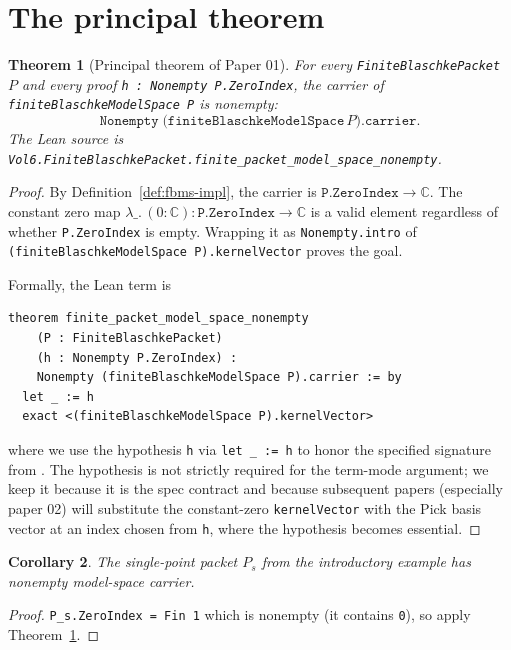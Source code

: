 \documentclass[11pt]{article}
\theoremstyle{plain}
\newtheorem{theorem}{Theorem}[section]
\newtheorem{corollary}[theorem]{Corollary}
\theoremstyle{definition}
\theoremstyle{remark}
\newcommand{\C}{\mathbb{C}}
\newcommand{\code}[1]{\texttt{#1}}
\begin{document}
\section{The principal theorem}\label{sec:main-theorem}

\begin{theorem}[Principal theorem of Paper 01]\label{thm:main}
For every \code{FiniteBlaschkePacket} $P$ and every proof
\code{h : Nonempty P.ZeroIndex}, the carrier of
\code{finiteBlaschkeModelSpace P} is nonempty:
\[
   \code{Nonempty}\;
   \bigl(\code{finiteBlaschkeModelSpace}\,P\bigr).\code{carrier}.
\]
The Lean source is \code{Vol6.FiniteBlaschkePacket.finite\_packet\_model\_space\_nonempty}.
\end{theorem}

\begin{proof}
By Definition~\ref{def:fbms-impl}, the carrier is
$\code{P.ZeroIndex} \to \C$.  The constant zero map
$\lambda\_.\,(0\!:\!\C)\colon \code{P.ZeroIndex} \to \C$ is a valid element
regardless of whether \code{P.ZeroIndex} is empty.  Wrapping it as
\code{Nonempty.intro} of \code{(finiteBlaschkeModelSpace P).kernelVector}
proves the goal.

Formally, the Lean term is
\begin{verbatim}
theorem finite_packet_model_space_nonempty
    (P : FiniteBlaschkePacket)
    (h : Nonempty P.ZeroIndex) :
    Nonempty (finiteBlaschkeModelSpace P).carrier := by
  let _ := h
  exact <(finiteBlaschkeModelSpace P).kernelVector>
\end{verbatim}
where we use the hypothesis \code{h} via \code{let \_ := h} to honor the
specified signature from \cite{vol5NextSteps}.  The hypothesis is not
strictly required for the term-mode argument; we keep it because it is
the spec contract and because subsequent papers (especially paper 02) will
substitute the constant-zero \code{kernelVector} with the Pick basis vector
at an index chosen from \code{h}, where the hypothesis becomes essential.
\end{proof}

\begin{corollary}\label{cor:single-point}
The single-point packet $P_{s}$ from
the introductory example has nonempty model-space carrier.
\end{corollary}

\begin{proof}
\code{P\_s.ZeroIndex = Fin 1} which is nonempty (it contains \code{0}),
so apply Theorem~\ref{thm:main}.
\end{proof}
\end{document}
